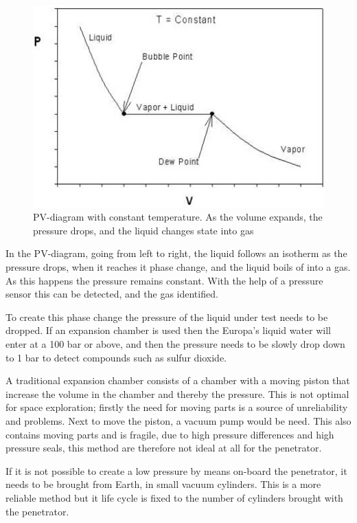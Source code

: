 \begin{figure}[htb]
  \centering
  \includegraphics[scale=1]{figures/GasDetectionAgge/PVdiagram}
  \caption{PV-diagram with constant temperature. As the volume expands, the pressure drops, and the liquid changes state into gas}
\end{figure}

In the PV-diagram, going from left to right, the liquid follows an isotherm as the pressure drops, when it reaches it phase change, and the liquid boils of into a gas. As this happens the pressure remains constant. With the help of a pressure sensor this can be detected, and the gas identified.

To create this phase change the pressure of the liquid under test needs to be dropped. If an expansion chamber is used then the Europa's liquid water will enter at a 100 bar or above, and then the pressure needs to be slowly drop down to 1 bar to detect compounds such as sulfur dioxide.

A traditional expansion chamber consists of a chamber with a moving piston that increase the volume in the chamber and thereby the pressure. This is not optimal for space exploration; firstly the need for moving parts is a source of unreliability and problems. Next to move the piston, a vacuum pump would be need. This also contains moving parts and is fragile, due to high pressure differences and high pressure seals, this method are therefore not ideal at all for the penetrator.

If it is not possible to create a low pressure by means on-board the penetrator, it needs to be brought from Earth, in small vacuum cylinders. This is a more reliable method but it life cycle is fixed to the number of cylinders brought with the penetrator.

